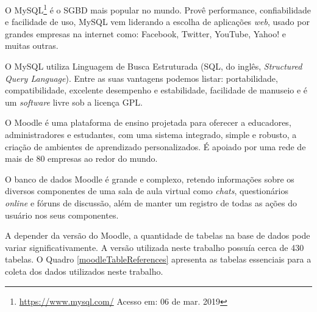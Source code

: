 O MySQL\footnote{\url{https://www.mysql.com/} Acesso em: 06 de mar. 2019} é o SGBD
mais popular no mundo. Provê performance, confiabilidade e facilidade de uso,
MySQL vem liderando a escolha de aplicações \textit{web}, usado por grandes
empresas na internet como: Facebook, Twitter, YouTube, Yahoo! e muitas outras.

O MySQL utiliza Linguagem de Busca Estruturada (SQL, do inglês,
\textit{Structured Query Language}). Entre as suas vantagens podemos listar:
portabilidade, compatibilidade, excelente desempenho e estabilidade, facilidade
de manuseio e é um \textit{software} livre sob a licença GPL.

O Moodle é uma plataforma de ensino projetada para oferecer a educadores,
administradores e estudantes, com uma sistema integrado, simple e robusto, a
criação de ambientes de aprendizado personalizados. É apoiado por uma rede de
mais de 80 empresas ao redor do mundo.

O banco de dados Moodle é grande e complexo, retendo informações sobre os
diversos componentes de uma sala de aula virtual como \textit{chats},
questionários \textit{online} e fóruns de discussão, além de manter um registro
de todas as ações do usuário nos seus componentes.

A depender da versão do Moodle, a quantidade de tabelas na base de dados pode
variar significativamente. A versão utilizada neste trabalho possuía cerca de
430 tabelas. O Quadro \ref{moodleTableReferences} apresenta as tabelas
essenciais para a coleta dos dados utilizados neste trabalho.

